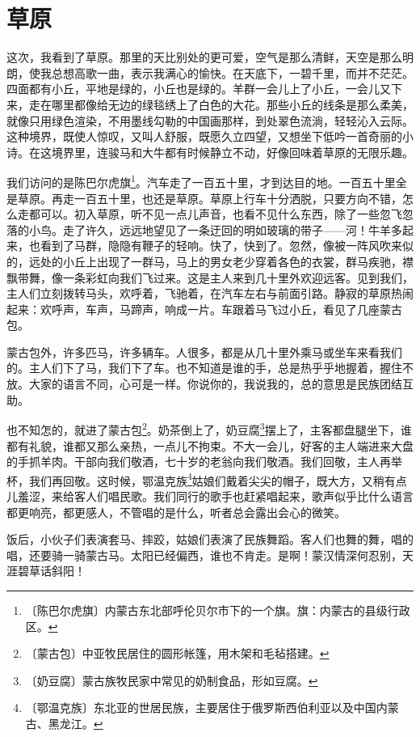 \documentclass[12pt,UTF-8,openany]{ctexbook}
\begin{document}
\chapter{草原}

\begin{Large}
    
    这次，我看到了草原。那里的天比别处的更可爱，空气是那么清鲜，天空是那么明朗，使我总想高歌一曲，表示我满心的愉快。在天底下，一碧千里，而并不茫茫。四面都有小丘，平地是绿的，小丘也是绿的。羊群一会儿上了小丘，一会儿又下来，走在哪里都像给无边的绿毯绣上了白色的大花。那些小丘的线条是那么柔美，就像只用绿色渲染，不用墨线勾勒的中国画那样，到处翠色流淌，轻轻沁入云际。这种境界，既使人惊叹，又叫人舒服，既愿久立四望，又想坐下低吟一首奇丽的小诗。在这境界里，连骏马和大牛都有时候静立不动，好像回味着草原的无限乐趣。
    
    我们访问的是陈巴尔虎旗\footnote{〔陈巴尔虎旗〕内蒙古东北部呼伦贝尔市下的一个旗。旗：内蒙古的县级行政区。}。汽车走了一百五十里，才到达目的地。一百五十里全是草原。再走一百五十里，也还是草原。草原上行车十分洒脱，只要方向不错，怎么走都可以。初入草原，听不见一点儿声音，也看不见什么东西，除了一些忽飞忽落的小鸟。走了许久，远远地望见了一条迂回的明如玻璃的带子——河！牛羊多起来，也看到了马群，隐隐有鞭子的轻响。快了，快到了。忽然，像被一阵风吹来似的，远处的小丘上出现了一群马，马上的男女老少穿着各色的衣裳，群马疾驰，襟飘带舞，像一条彩虹向我们飞过来。这是主人来到几十里外欢迎远客。见到我们，主人们立刻拨转马头，欢呼着，飞驰着，在汽车左右与前面引路。静寂的草原热闹起来：欢呼声，车声，马蹄声，响成一片。车跟着马飞过小丘，看见了几座蒙古包。
    
    蒙古包外，许多匹马，许多辆车。人很多，都是从几十里外乘马或坐车来看我们的。主人们下了马，我们下了车。也不知道是谁的手，总是热乎乎地握着，握住不放。大家的语言不同，心可是一样。你说你的，我说我的，总的意思是民族团结互助。
    
    也不知怎的，就进了蒙古包\footnote{〔蒙古包〕中亚牧民居住的圆形帐篷，用木架和毛毡搭建。}。奶茶倒上了，奶豆腐\footnote{〔奶豆腐〕蒙古族牧民家中常见的奶制食品，形如豆腐。}摆上了，主客都盘腿坐下，谁都有礼貌，谁都又那么亲热，一点儿不拘束。不大一会儿，好客的主人端进来大盘的手抓羊肉。干部向我们敬酒，七十岁的老翁向我们敬酒。我们回敬，主人再举杯，我们再回敬。这时候，鄂温克族\footnote{〔鄂温克族〕东北亚的世居民族，主要居住于俄罗斯西伯利亚以及中国内蒙古、黑龙江。}姑娘们戴着尖尖的帽子，既大方，又稍有点儿羞涩，来给客人们唱民歌。我们同行的歌手也赶紧唱起来，歌声似乎比什么语言都更响亮，都更感人，不管唱的是什么，听者总会露出会心的微笑。
    
    饭后，小伙子们表演套马、摔跤，姑娘们表演了民族舞蹈。客人们也舞的舞，唱的唱，还要骑一骑蒙古马。太阳已经偏西，谁也不肯走。是啊！蒙汉情深何忍别，天涯碧草话斜阳！
    
\end{Large}
\end{document}
